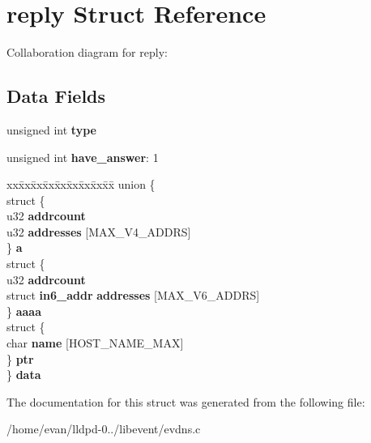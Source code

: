 \section{reply \-Struct \-Reference}
\label{structreply}


\-Collaboration diagram for reply\-:
\subsection*{\-Data \-Fields}
\begin{DoxyCompactItemize}
\item 
unsigned int {\bfseries type}\label{structreply_a4bfea42429249a1f65204f0c0f34704a}

\item 
unsigned int {\bfseries have\-\_\-answer}\-: 1\label{structreply_a1d6e7ef5a18922cdb2a226a4a27b1fbb}

\item 
\begin{tabbing}
xx\=xx\=xx\=xx\=xx\=xx\=xx\=xx\=xx\=\kill
union \{\\
\>struct \{\\
\>\>u32 {\bfseries addrcount}\\
\>\>u32 {\bfseries addresses} [MAX\_V4\_ADDRS]\\
\>\} {\bfseries a}\\
\>struct \{\\
\>\>u32 {\bfseries addrcount}\\
\>\>struct {\bf in6\_addr} {\bfseries addresses} [MAX\_V6\_ADDRS]\\
\>\} {\bfseries aaaa}\\
\>struct \{\\
\>\>char {\bfseries name} [HOST\_NAME\_MAX]\\
\>\} {\bfseries ptr}\\
\} {\bfseries data}\label{structreply_a8100e148d9aa4faeede59b5cc568c9ef}
\\

\end{tabbing}\end{DoxyCompactItemize}


\-The documentation for this struct was generated from the following file\-:\begin{DoxyCompactItemize}
\item 
/home/evan/lldpd-\/0../libevent/evdns.\-c\end{DoxyCompactItemize}
